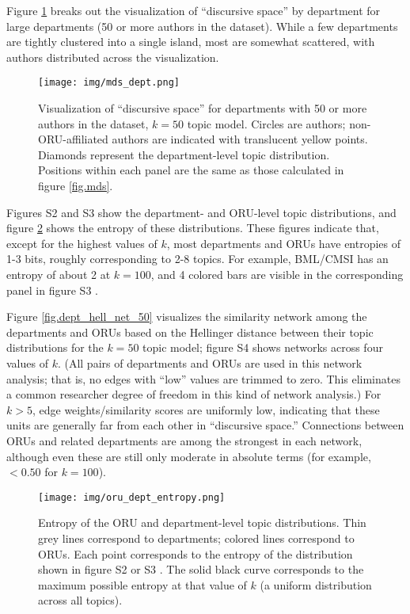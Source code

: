 \documentclass[
  11pt,
]{article}
\begin{document}
Figure \ref{fig.mds_dept} breaks out the visualization of ``discursive space'' by department for large departments (50 or more authors in the dataset). While a few departments are tightly clustered into a single island, most are somewhat scattered, with authors distributed across the visualization.

\begin{figure}
\centering
\texttt{[image: img/mds\_dept.png]}
\caption{Visualization of ``discursive space'' for departments with 50 or more authors in the dataset, \(k=50\) topic model. Circles are authors; non-ORU-affiliated authors are indicated with translucent yellow points. Diamonds represent the department-level topic distribution. Positions within each panel are the same as those calculated in figure \ref{fig.mds}.\label{fig.mds_dept}}
\end{figure}

Figures S2 and S3 show the department- and ORU-level topic distributions, and figure \ref{fig.oru_dept_entropy} shows the entropy of these distributions. These figures indicate that, except for the highest values of \(k\), most departments and ORUs have entropies of 1-3 bits, roughly corresponding to 2-8 topics. For example, BML/CMSI has an entropy of about 2 at \(k=100\), and 4 colored bars are visible in the corresponding panel in figure S3 .

Figure \ref{fig.dept_hell_net_50} visualizes the similarity network among the departments and ORUs based on the Hellinger distance between their topic distributions for the \(k=50\) topic model; figure S4 shows networks across four values of \(k\). (All pairs of departments and ORUs are used in this network analysis; that is, no edges with ``low'' values are trimmed to zero. This eliminates a common researcher degree of freedom in this kind of network analysis.) For \(k>5\), edge weights/similarity scores are uniformly low, indicating that these units are generally far from each other in ``discursive space.'' Connections between ORUs and related departments are among the strongest in each network, although even these are still only moderate in absolute terms (for example, \(<0.50\) for \(k=100\)).

\begin{figure}
\centering
\texttt{[image: img/oru\_dept\_entropy.png]}
\caption{Entropy of the ORU and department-level topic distributions. Thin grey lines correspond to departments; colored lines correspond to ORUs. Each point corresponds to the entropy of the distribution shown in figure S2 or S3 . The solid black curve corresponds to the maximum possible entropy at that value of \(k\) (a uniform distribution across all topics). \label{fig.oru_dept_entropy}}
\end{figure}
\end{document}
